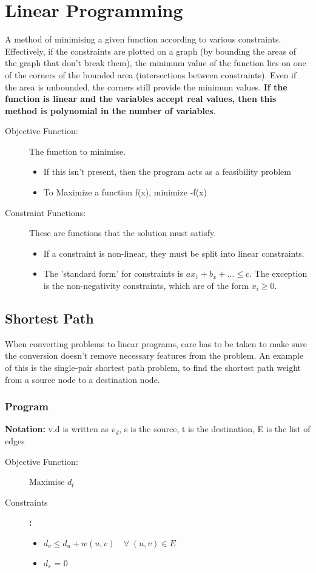 \section{Linear Programming}
A method of minimising a given function according to various constraints. Effectively, if the constraints are plotted on a graph (by bounding the areas of the graph that don't break them), the minimum value of the function lies on one of the corners of the bounded area (intersections between constraints). Even if the area is unbounded, the corners still provide the minimum values. \textbf{If the function is linear and the variables accept real values, then this method is polynomial in the number of variables}.

\begin{description}
\item [Objective Function:] The function to minimise. 
\begin{itemize}
    \item If this isn't present, then the program acts as a feasibility problem
    \item To Maximize a function f(x), minimize -f(x)
\end{itemize}
\item [Constraint Functions:] These are functions that the solution must satisfy. 
\begin{itemize}
    \item If a constraint is non-linear, they must be split into linear constraints. 
    \item The 'standard form' for constraints is \(ax_1+b_x+\dots \leq c\). The exception is the non-negativity constraints, which are of the form \(x_i \geq 0\).
\end{itemize}
\end{description}

\subsection{Shortest Path}
When converting problems to linear programs, care has to be taken to make sure the conversion doesn't remove necessary features from the problem. An example of this is the single-pair shortest path problem, to find the shortest path weight from a source node to a destination node.

\subsubsection{Program}
\textbf{Notation:} v.d is written as $v_d$, s is the source, t is the destination, E is the list of edges
\begin{description}
\item [Objective Function:] Maximise $d_t$
\item [Constraints]\textbf{:}  
\begin{itemize}
    \item \(d_v \leq d_u + w(u,v)\quad \forall \;(u,v) \in E\)
    \item $d_s$ = 0
\end{itemize}
\end{description}

